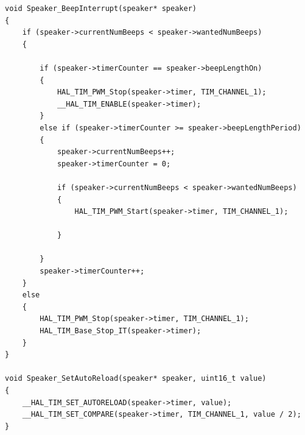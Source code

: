 \documentclass{article}
\begin{document}
\begin{lstlisting}[caption={Source Code : STM32 Speaker Firmware}, label={lst:stm32_speaker_code}]
void Speaker_BeepInterrupt(speaker* speaker)
{
    if (speaker->currentNumBeeps < speaker->wantedNumBeeps)
    {

        if (speaker->timerCounter == speaker->beepLengthOn)
        {
            HAL_TIM_PWM_Stop(speaker->timer, TIM_CHANNEL_1);
            __HAL_TIM_ENABLE(speaker->timer);
        }
        else if (speaker->timerCounter >= speaker->beepLengthPeriod)
        {
        	speaker->currentNumBeeps++;
			speaker->timerCounter = 0;

            if (speaker->currentNumBeeps < speaker->wantedNumBeeps)
            {
                HAL_TIM_PWM_Start(speaker->timer, TIM_CHANNEL_1);

            }

        }
        speaker->timerCounter++;
    }
    else
    {
        HAL_TIM_PWM_Stop(speaker->timer, TIM_CHANNEL_1);
        HAL_TIM_Base_Stop_IT(speaker->timer);
    }
}

void Speaker_SetAutoReload(speaker* speaker, uint16_t value)
{
	__HAL_TIM_SET_AUTORELOAD(speaker->timer, value);
	__HAL_TIM_SET_COMPARE(speaker->timer, TIM_CHANNEL_1, value / 2);
}

\end{lstlisting}
\end{document}
